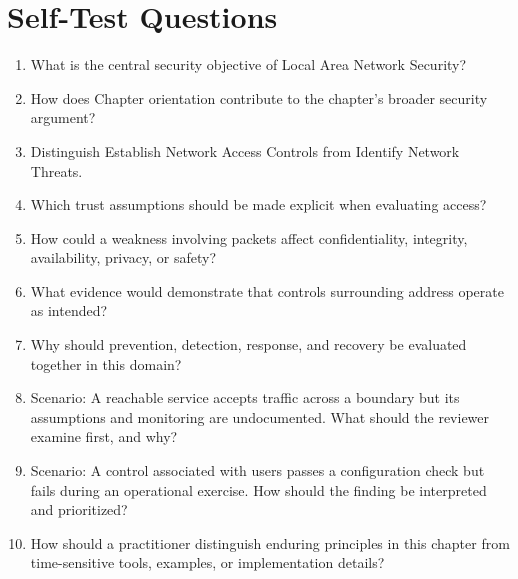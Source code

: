 \documentclass[11pt]{article}
\begin{document}
\section*{Self-Test Questions}
\begin{enumerate}
\item What is the central security objective of Local Area Network Security?
\item How does Chapter orientation contribute to the chapter's broader security argument?
\item Distinguish Establish Network Access Controls from Identify Network Threats.
\item Which trust assumptions should be made explicit when evaluating access?
\item How could a weakness involving packets affect confidentiality, integrity, availability, privacy, or safety?
\item What evidence would demonstrate that controls surrounding address operate as intended?
\item Why should prevention, detection, response, and recovery be evaluated together in this domain?
\item Scenario: A reachable service accepts traffic across a boundary but its assumptions and monitoring are undocumented. What should the reviewer examine first, and why?
\item Scenario: A control associated with users passes a configuration check but fails during an operational exercise. How should the finding be interpreted and prioritized?
\item How should a practitioner distinguish enduring principles in this chapter from time-sensitive tools, examples, or implementation details?
\end{enumerate}
\end{document}
